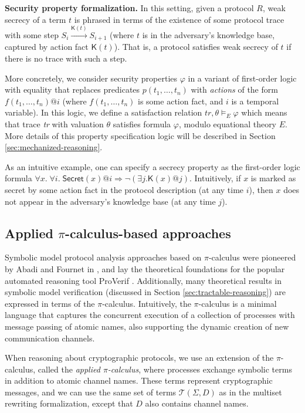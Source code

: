 \documentclass{article}
\theoremstyle{definition}
\begin{document}
\textbf{Security property formalization.} In this setting, given a protocol $R$, weak secrecy of a term $t$ is phrased in terms of the existence of some protocol trace with some step $S_i \xrightarrow{\mathsf{K}(t)} S_{i+1}$ (where $t$ is in the adversary's knowledge base, captured by action fact $\mathsf{K}(t)$). That is, a protocol satisfies weak secrecy of $t$ if there is no trace with such a step.

More concretely, we consider security properties $\varphi$ in a variant of first-order logic with equality that replaces predicates $p(t_1, \dots, t_n)$ with \textit{actions} of the form $f(t_1, \dots, t_n)@i$ (where $f(t_1, \dots, t_n)$ is some action fact, and $i$ is a temporal variable).
In this logic, we define a satisfaction relation $\mathit{tr}, \theta \models_E \varphi$ which means that trace \emph{tr} with valuation $\theta$ satisfies formula $\varphi$, modulo equational theory $E$. More details of this property specification logic will be described in Section \ref{sec:mechanized-reasoning}.

As an intuitive example, one can specify a secrecy property as the first-order logic formula $\forall x. \; \forall i. \; \mathsf{Secret}(x) @i \Rightarrow \neg (\exists j. \mathsf{K}(x)@j)$. 
Intuitively, if $x$ is marked as secret by some action fact in the protocol description (at any time $i$), 
then $x$ does not appear in the adversary's knowledge base (at any time $j$).

\subsection{Applied $\pi$-calculus-based approaches}\label{sec:apc-approaches}
Symbolic model protocol analysis approaches based on $\pi$-calculus were pioneered by Abadi and Fournet in \cite{apc}, and lay the theoretical foundations for the popular automated reasoning tool ProVerif \cite{proverif}. Additionally, many theoretical results in symbolic model verification (discussed in Section \ref{sec:tractable-reasoning}) are expressed in terms of the $\pi$-calculus. Intuitively, the $\pi$-calculus is a minimal language that captures the concurrent execution of a collection of processes with message passing of atomic names, also supporting the dynamic creation of new communication channels.

When reasoning about cryptographic protocols, we use an extension of the $\pi$-calculus, called the \textit{applied $\pi$-calculus}, where processes exchange symbolic terms in addition to atomic channel names. These terms represent cryptographic messages, and we can use the same set of terms $\mathcal{T}(\Sigma, D)$ as in the multiset rewriting formalization, except that $D$ also contains channel names.
\end{document}
